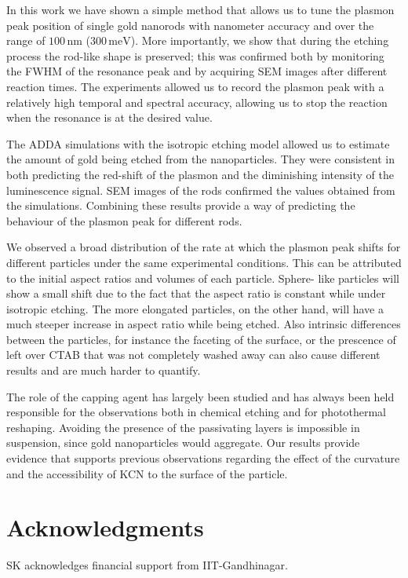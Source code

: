 \documentclass[a4paper,oneside,onecolumn]{article}
\newcommand{\nm}{\ensuremath{\,\textrm{nm}}}
\newcommand{\meV}{\ensuremath{\,\textrm{meV}}}
\begin{document}
In this work we have shown a simple method that allows us to tune the plasmon
peak position of single gold nanorods with nanometer accuracy and over the
range of $100\nm$ ($300\meV$). More importantly, we show that during the
etching process the rod-like shape is preserved; this was confirmed both by
monitoring the FWHM of the resonance peak and by acquiring SEM images after
different reaction times. The experiments allowed us to record the plasmon
peak with a relatively high temporal and spectral accuracy, allowing us to
stop the reaction when the resonance is at the desired value.

The ADDA simulations with the isotropic etching model allowed us to estimate
the amount of gold being etched from the nanoparticles. They were consistent
in both predicting the red-shift of the plasmon and the diminishing intensity
of the luminescence signal. SEM images of the rods confirmed the values
obtained from the simulations. Combining these results provide a way of
predicting the behaviour of the plasmon peak for different rods.

We observed a broad distribution of the rate at which the plasmon peak shifts
for different particles under the same experimental conditions. This can be
attributed to the initial aspect ratios and volumes of each particle. Sphere-
like particles will show a small shift due to the fact that the aspect ratio
is constant while under isotropic etching. The more elongated particles, on
the other hand, will have a much steeper increase in aspect ratio while being
etched. Also intrinsic differences between the particles, for instance the
faceting of the surface, or the prescence of left over CTAB that was not
completely washed away can also cause different results and are much harder to
quantify.

The role of the capping agent has largely been studied and has always been
held responsible for the observations both in chemical etching\cite{Yuan2015}
and for photothermal reshaping\cite{Horiguchi2008}. Avoiding the presence of
the passivating layers is impossible in suspension, since gold nanoparticles
would aggregate. Our results provide evidence that supports previous
observations regarding the effect of the curvature and the accessibility of
KCN to the surface of the particle.

\section{Acknowledgments}
SK acknowledges financial support from IIT-Gandhinagar.

{}

\end{document}
